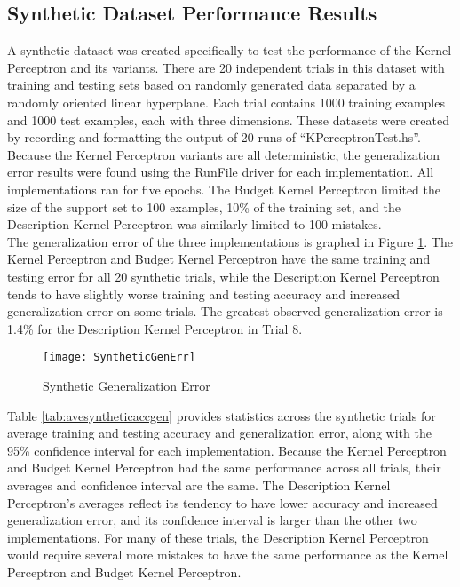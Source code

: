 \subsection{Synthetic Dataset Performance Results}\label{SyntheticResults}
A synthetic dataset was created specifically to test the performance of the Kernel Perceptron and its variants. There are 20 independent trials in this dataset with training and testing sets based on randomly generated data separated by a randomly oriented linear hyperplane. Each trial contains 1000 training examples and 1000 test examples, each with three dimensions. These datasets were created by recording and formatting the output of 20 runs of ``KPerceptronTest.hs''. 
\\Because the Kernel Perceptron variants are all deterministic, the generalization error results were found using the RunFile driver for each implementation. All implementations ran for five epochs. The Budget Kernel Perceptron limited the size of the support set to 100 examples, 10\% of the training set, and the Description Kernel Perceptron was similarly limited to 100 mistakes. 
\\The generalization error of the three implementations is graphed in Figure \ref{SyntheticGenErrFig}. The Kernel Perceptron and Budget Kernel Perceptron have the same training and testing error for all 20 synthetic trials, while the Description Kernel Perceptron tends to have slightly worse training and testing accuracy and increased generalization error on some trials. The greatest observed generalization error is 1.4\% for the Description Kernel Perceptron in Trial 8.

\begin{figure}[h]
 \caption{Synthetic Generalization Error}
 \label{SyntheticGenErrFig}
 \begin{center}
  \texttt{[image: SyntheticGenErr]}
 \end{center}
\end{figure}

Table \ref{tab:avesyntheticaccgen} provides statistics across the synthetic trials for average training and testing accuracy and generalization error, along with the 95\% confidence interval for each implementation. Because the Kernel Perceptron and Budget Kernel Perceptron had the same performance across all trials, their averages and confidence interval are the same. The Description Kernel Perceptron's averages reflect its tendency to have lower accuracy and increased generalization error, and its confidence interval is larger than the other two implementations. For many of these trials, the Description Kernel Perceptron would require several more mistakes to have the same performance as the Kernel Perceptron and Budget Kernel Perceptron.

